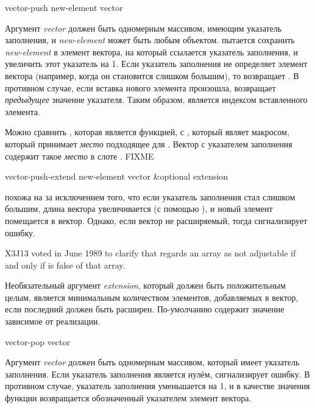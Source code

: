 \begin{defun}[Функция]
vector-push new-element vector

Аргумент \emph{vector} должен быть одномерным массивом, имеющим указатель
заполнения, и \emph{new-element} может быть любым объектом.
 пытается сохранить \emph{new-element} в элемент вектора, на
который ссылается указатель заполнения, и увеличить этот указатель на 1. Если
указатель заполнения не определяет элемент вектора (например, когда он
становится слишком большим), то  возвращает {\false}. В
противном случае, если вставка нового элемента произошла, 
возвращает \emph{предыдущее} значение указателя. Таким образом, 
является индексом вставленного элемента.

Можно сравнить , которая является функцией, с ,
который являет макросом, который принимает \emph{место} подходящее для
.
Вектор с указателем заполнения содержит такое \emph{место} в слоте
. FIXME
\end{defun}

\begin{defun}[Функция]
vector-push-extend new-element vector &optional extension

 похожа на  за исключением того, что
если указатель заполнения стал слишком большим, длина вектора увеличивается (с
помощью ), и новый элемент помещается в вектор.
Однако, если вектор не расширяемый, тогда  сигнализирует
ошибку.

\begin{newer}
X3J13 voted in June 1989
to clarify that  regards an array as
not adjustable if and only if  is false
of that array.
\end{newer}

Необязательный аргумент \emph{extension}, который должен быть положительным
целым, является минимальным количеством элементов, добавляемых в вектор, если
последний должен быть расширен. По-умолчанию содержит значение зависимое от
реализации.
\end{defun}

\begin{defun}[Функция]
vector-pop vector

Аргумент \emph{vector} должен быть одномерным массивом, который имеет указатель
заполнения.
Если указатель заполнения является нулём,  сигнализирует ошибку.
В противном случае, указатель заполнения уменьшается на 1, и в качестве значения
функции возвращается обозначенный указателем элемент вектора.
\end{defun}

